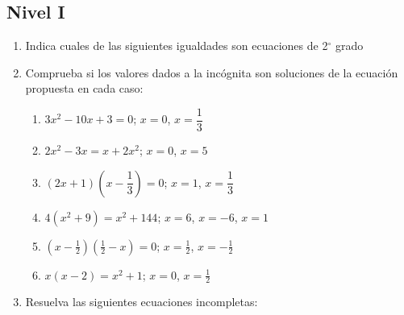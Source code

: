 \documentclass[letterpaper,11pt,twoside]{article}
\begin{document}
\subsection*{Nivel I}
 \begin{enumerate}
 \item Indica cuales de las siguientes igualdades son ecuaciones de 2$^{\circ}$ grado
 \begin{enumerate}
 \end{enumerate}
 \item Comprueba si los valores dados a la incógnita son soluciones de la ecuación propuesta en cada caso:
 \begin{enumerate}
 \item $3x^{2}-10x+3=0$; \qquad $x=0$, $x=\dfrac{1}{3}$
 \item $2x^{2}-3x=x+2x^{2}$; \qquad $x=0$, $x=5$
 \item $(2x+1)\left(x-\dfrac{1}{3}\right)=0$; \qquad $x=1$, $x=\dfrac{1}{3}$
 \item $4(x^{2}+9)=x^{2}+144$; \; $x=6$, $x=-6$, $x=1$
 \item $\left(x-\frac{1}{2}\right)\left(\frac{1}{2}-x\right)=0$; \qquad $x=\frac{1}{2}$, $x=-\frac{1}{2}$
 \item $x(x-2)=x^{2}+1$; \qquad $x=0$, $x=\frac{1}{2}$
 \end{enumerate}
 \item Resuelva las siguientes ecuaciones incompletas:
 \begin{enumerate}
 \end{enumerate}

\end{enumerate}
\end{document}
